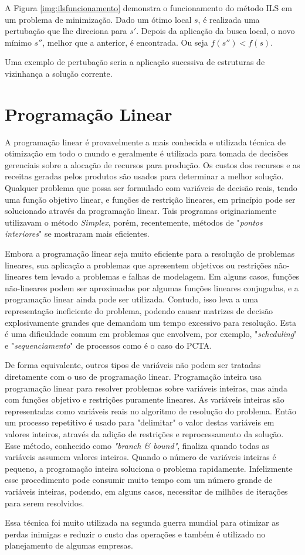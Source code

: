 A Figura \ref{img:ilsfuncionamento} demonstra o funcionamento do método ILS em um problema de minimização. Dado um ótimo local $s$, é realizada uma pertubação que lhe direciona para $s{'}$. Depois da aplicação da busca local, o novo mínimo $s{''}$, melhor que a anterior, é encontrada. Ou seja $f(s{''}) < f(s)$.

Uma exemplo de pertubação seria a aplicação sucessiva de estruturas de vizinhança a solução corrente.

\section{Programação Linear}

A programação linear é provavelmente a mais conhecida e utilizada técnica de
otimização em todo o mundo e geralmente é utilizada para tomada de
decisões gerenciais sobre a alocação de recursos para produção. Os custos dos recursos e
as receitas geradas pelos produtos são usados para determinar a melhor solução.
Qualquer problema que possa ser formulado com variáveis de decisão reais, tendo
uma função objetivo linear, e funções de restrição lineares, em princípio pode
ser solucionado através da programação linear. Tais programas originariamente
utilizavam o método \textit{Simplex}, porém, recentemente, métodos de
"\textit{pontos interiores}" se mostraram mais eficientes.

Embora a programação linear seja muito eficiente para a resolução de problemas
lineares, sua aplicação a problemas que apresentem objetivos ou restrições
não-lineares tem levado a problemas e falhas de modelagem. Em alguns casos,
funções não-lineares podem ser aproximadas por algumas funções lineares
conjugadas, e a programação linear ainda pode ser utilizada. Contudo, isso leva
a uma representação ineficiente do problema, podendo causar matrizes de decisão
explosivamente grandes que demandam um tempo excessivo para resolução. Esta é
uma dificuldade comum em problemas que envolvem, por exemplo,
"\textit{scheduling}" e "\textit{sequenciamento}" de processos como é o caso do
PCTA.

De forma equivalente, outros tipos de variáveis não podem ser tratadas
diretamente com o uso de programação linear. Programação inteira usa
programação linear para resolver problemas sobre variáveis inteiras, mas ainda
com funções objetivo e restrições puramente lineares. As variáveis inteiras são
representadas como variáveis reais no algoritmo de resolução do problema. Então
um processo repetitivo é usado para "delimitar" o valor destas variáveis em
valores inteiros, através da adição de restrições e reprocessamento da solução.
Esse método, conhecido como \textit{"branch \& bound"}, finaliza quando todas
as variáveis assumem valores inteiros. Quando o número de variáveis inteiras é
pequeno, a programação inteira soluciona o problema rapidamente. Infelizmente
esse procedimento pode consumir muito tempo com um número grande de variáveis
inteiras, podendo, em alguns casos, necessitar de milhões de iterações para
serem resolvidos.
 	
Essa técnica foi muito utilizada na segunda guerra mundial para otimizar as
perdas inimigas e reduzir o custo das operações e também é utilizado no
planejamento de algumas empresas.

